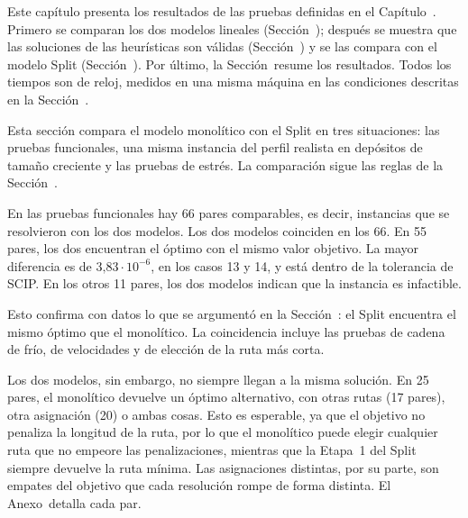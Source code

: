 \startchapter[title={Resultados}, reference=Capitulo_6]

Este capítulo presenta los resultados de las pruebas definidas en el
Capítulo~\in[Capitulo_5]. Primero se comparan los dos modelos lineales
(Sección~); después se muestra que las
soluciones de las heurísticas son válidas (Sección~)
y se las compara con el modelo Split
(Sección~). Por último, la
Sección~ resume los resultados. Todos
los tiempos son de reloj, medidos en una misma máquina en las condiciones
descritas en la Sección~.

\startsection[title={Comparación entre modelos lineales}, reference=sec:comparacion_lineales]

Esta sección compara el modelo monolítico con el Split en tres situaciones:
las pruebas funcionales, una misma instancia del perfil realista en depósitos
de tamaño creciente y las pruebas de estrés. La comparación sigue las reglas
de la Sección~.

\startsubsection[title={Mismo óptimo}, reference=sec:mismo_optimo]

En las pruebas funcionales hay 66 pares comparables, es decir, instancias
que se resolvieron con los dos modelos. Los dos modelos coinciden en los 66.
En 55 pares, los dos encuentran el óptimo con el mismo valor
objetivo. La mayor diferencia es de $3\mathord{,}83 \cdot 10^{-6}$, en los
casos 13 y 14, y está dentro de la tolerancia de SCIP. En los otros 11 pares,
los dos modelos indican que la instancia es infactible.

Esto confirma con datos lo que se argumentó en la
Sección~: el Split encuentra el mismo óptimo que el
monolítico. La coincidencia incluye las pruebas de cadena de frío, de
velocidades y de elección de la ruta más corta.

Los dos modelos, sin embargo, no siempre llegan a la misma solución. En
25 pares, el monolítico devuelve un óptimo
alternativo, con otras rutas (17 pares), otra asignación (20) o ambas cosas.
Esto es esperable, ya que el objetivo no penaliza la longitud de la ruta, por lo que el
monolítico puede elegir cualquier ruta que no empeore las penalizaciones,
mientras que la Etapa~1 del Split siempre devuelve la ruta mínima. Las
asignaciones distintas, por su parte, son empates del objetivo que cada
resolución rompe de forma distinta. El Anexo~ detalla
cada par.

